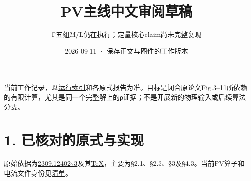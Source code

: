 \documentclass[
  10pt,
  a4paper,
]{article}
\title{PV主线中文审阅草稿}
\subtitle{F五组M/L仍在执行；定量核心claim尚未完整复现}
\author{}
\date{2026-09-11 · 保存正文与图件的工作版本}
\begin{document}
\maketitle

{
\setcounter{tocdepth}{1}
\tableofcontents
}
\begin{center}
\end{center}

当前工作记录，以\href{../PROGRESS.json}{运行索引}和各原式报告为准。目标是闭合原论文Fig.3--11所依赖的有限计算，尤其是同一个完整解上的ρ证据；不是开展新的物理输入或后续算法分支。

\section{1.
已核对的原式与实现}\label{ux5df2ux6838ux5bf9ux7684ux539fux5f0fux4e0eux5b9eux73b0}

原始依据为\href{../../../../references/2309.12402v3.pdf}{2309.12402v3}及其\href{../../../../references/2309.12402v3-source/prd_submission_2.tex}{TeX}，主要为§2.1、§2.3、§3及§4.3。当前PV算子和电流文件身份见\href{../PV_SAME_INPUTS_INVENTORY.md}{清单}。
\end{document}

